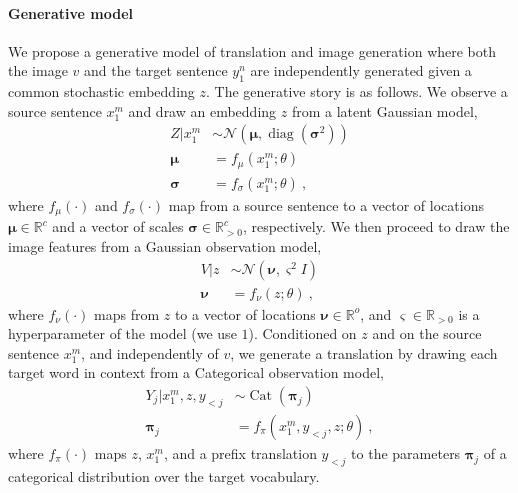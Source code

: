 \documentclass[11pt,a4paper]{article}
\DeclareMathOperator{\diag}{diag}
\DeclareMathOperator{\Cat}{Cat}
\begin{document}
\paragraph{Generative model} We propose a generative model of translation and image generation where both the image $v$ and the target sentence $y_1^n$ are independently generated given a common stochastic embedding $z$. 
The generative story is as follows.
We observe a source sentence $x_1^m$ and draw an embedding $z$ from a latent Gaussian model, 
\begin{equation}\label{eq:gaussian-latent-model}
\begin{aligned}
	Z|x_1^m &\sim \mathcal N(\boldsymbol\mu, \diag(\boldsymbol\sigma^2)) \\
    \boldsymbol\mu &= f_\mu(x_1^m; \theta) \\
    \boldsymbol\sigma &= f_\sigma(x_1^m; \theta) ~,
\end{aligned}
\end{equation}
where $f_\mu(\cdot)$ and $f_\sigma(\cdot)$ map from a source sentence to a vector of locations $\boldsymbol\mu \in \mathbb R^c$ and a vector of scales $\boldsymbol\sigma \in \mathbb R^c_{>0}$, respectively.
We then proceed to draw the image features from a Gaussian observation model,
\begin{equation}\label{eq:gaussian-obs-model}
\begin{aligned}
	V|z &\sim \mathcal N(\boldsymbol \nu, \varsigma^2 I) \\
\boldsymbol \nu &= f_\nu(z; \theta) ~ , \end{aligned}
\end{equation}
where $f_\nu(\cdot)$ maps from $z$ to a vector of locations $\boldsymbol \nu \in \mathbb R^o$, and $\varsigma \in \mathbb R_{>0}$ is a hyperparameter of the model (we use $1$).
Conditioned on $z$ and on the source sentence $x_1^m$, and independently of $v$, we generate a translation by drawing each target word in context from a Categorical observation model,
\begin{equation}\label{eq:cat-obs-model}
\begin{aligned}
Y_j| x_1^m, z, y_{<j} &\sim \Cat(\boldsymbol \pi_j) \\
\boldsymbol \pi_j &= f_\pi(x_1^m, y_{<j}, z; \theta) ~, 
\end{aligned}
\end{equation}
where $f_\pi(\cdot)$ maps $z$, $x_1^m$, and a prefix translation $y_{<j}$ to the parameters $\boldsymbol \pi_j$ of a categorical distribution over the target vocabulary.
\end{document}
